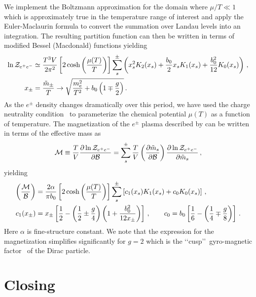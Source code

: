 \documentclass[a4paper]{article}
\begin{document}
We implement the Boltzmann approximation for the domain where $\mu/T\ll1$ which is approximately true in the temperature range of interest and apply the Euler-Maclaurin formula to convert the summation over Landau levels into an integration. The resulting partition function can then be written in terms of modified Bessel (Macdonald) functions yielding
\begin{align}
    \label{partitionfinal}
    \ln{\cal Z}_{e^{+}e^{-}}&\simeq\frac{T^{3}V}{2\pi^{2}}\left[2\cosh\left(\frac{\mu(T)}{T}\right)\right]\sum_{s}^{\pm}\left(x_{s}^{2}K_{2}(x_{s})+\frac{b_{0}}{2}x_{s}K_{1}(x_{s})+\frac{b_{0}^{2}}{12}K_{0}(x_{s})\right)\,,\\
    x_{\pm}&=\frac{{\tilde m}_{\pm}}{T}\rightarrow\sqrt{\frac{m_{e}^{2}}{T^{2}}+b_{0}\left(1\mp\frac{g}{2}\right)}\,.
\end{align}
As the $e^{\pm}$ density changes dramatically over this period, we have used the charge neutrality condition~\cite{rafelski2023short} to parameterize the chemical potential $\mu(T)$ as a function of temperature. The magnetization of the $e^{\pm}$ plasma described by  can be written in terms of the effective mass as
\begin{align}
    \label{definemagetization}
    {\cal M}\equiv\frac{T}{V}\frac{\partial\ln{{\cal Z}_{e^{+}e^{-}}}}{\partial{\cal B}}=\sum_{s}^{\pm}\frac{T}{V}\left(\frac{\partial{\tilde m}_{s}}{\partial{\cal B}}\right)\frac{\partial\ln{{\cal Z}_{e^{+}e^{-}}}}{\partial{\tilde m}_{s}}\,,
\end{align}
yielding
\begin{align}
    \label{magnetization}
    \left(\frac{\cal M}{\cal B}\right)&=\frac{2\alpha}{\pi b_{0}}\left[2\cosh\left(\frac{\mu(T)}{T}\right)\right]\sum_{s}^{\pm}\left[c_{1}(x_{s})K_{1}(x_{s})+c_{0}K_{0}(x_{s})\right]\,,\\
    c_{1}(x_{\pm})&=x_{\pm}\left[\frac{1}{2}-\left(\frac{1}{2}\pm\frac{g}{4}\right)\left(1+\frac{b_{0}^{2}}{12x_{\pm}}\right)\right]\,,\qquad c_{0}=b_{0}\left[\frac{1}{6}-\left(\frac{1}{4}\mp\frac{g}{8}\right)\right]\,.
\end{align}
Here $\alpha$ is fine-structure constant. We note that the expression for the magnetization simplifies significantly for $g=2$ which is the \lq\lq cusp\rq\rq\ gyro-magnetic factor~\cite{rafelski2022study} of the Dirac particle.

\section{Closing}\label{sec:conclusions}




\end{document}

